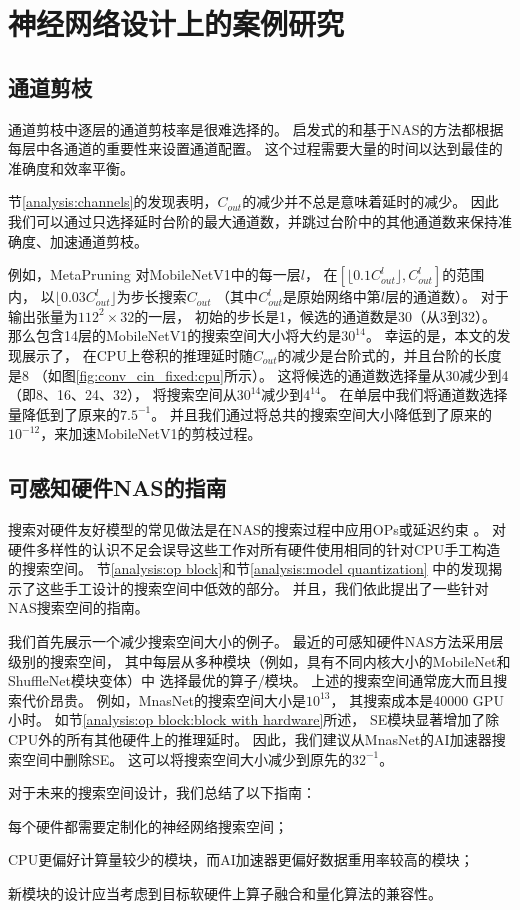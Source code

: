 \section{神经网络设计上的案例研究}
\label{case studies}

\subsection{通道剪枝}
通道剪枝中逐层的通道剪枝率是很难选择的。
启发式的和基于NAS的方法都根据每层中各通道的重要性来设置通道配置。
这个过程需要大量的时间以达到最佳的准确度和效率平衡。

节\ref{analysis:channels}的发现表明，$C_{out}$的减少并不总是意味着延时的减少。
因此我们可以通过只选择延时台阶的最大通道数，并跳过台阶中的其他通道数来保持准确度、加速通道剪枝。

例如，MetaPruning\cite{liu2019metapruning}
对MobileNetV1中的每一层$l$，
在$[\lfloor 0.1C_{out}^l \rfloor, C_{out}^l]$的范围内，
以$\lfloor 0.03C_{out}^l \rfloor$为步长搜索$C_{out}$
（其中$C_{out}^l$是原始网络中第$l$层的通道数）。
对于输出张量为$112^2\times 32$的一层，
初始的步长是1，候选的通道数是30（从3到32）。
那么包含14层的MobileNetV1的搜索空间大小将大约是$30^{14}$。
幸运的是，本文的发现展示了，
在CPU上卷积的推理延时随$C_{out}$的减少是台阶式的，并且台阶的长度是8
（如图\ref{fig:conv_cin_fixed:cpu}所示）。
这将候选的通道数选择量从30减少到4（即8、16、24、32），
将搜索空间从$30^{14}$减少到$4^{14}$。
在单层中我们将通道数选择量降低到了原来的$7.5^{-1}$。
并且我们通过将总共的搜索空间大小降低到了原来的$10^{-12}$，来加速MobileNetV1的剪枝过程。

\subsection{可感知硬件NAS的指南}
搜索对硬件友好模型的常见做法是在NAS的搜索过程中应用OPs或延迟约束
\cite{cai2018proxylessnas, wu2019fbnet}。
对硬件多样性的认识不足会误导这些工作对所有硬件使用相同的针对CPU手工构造的搜索空间。
节\ref{analysis:op block}和节\ref{analysis:model quantization}
中的发现揭示了这些手工设计的搜索空间中低效的部分。
并且，我们依此提出了一些针对NAS搜索空间的指南。

我们首先展示一个减少搜索空间大小的例子。
最近的可感知硬件NAS方法采用层级别的搜索空间，
其中每层从多种模块（例如，具有不同内核大小的MobileNet和ShuffleNet模块变体）中
选择最优的算子/模块。
上述的搜索空间通常庞大而且搜索代价昂贵。
例如，MnasNet的搜索空间大小是$10^{13}$，
其搜索成本是40000 GPU小时\cite{tan2019mnasnet}。
如节\ref{analysis:op block:block with hardware}所述，
SE模块显著增加了除CPU外的所有其他硬件上的推理延时。
因此，我们建议从MnasNet的AI加速器搜索空间中删除SE。
这可以将搜索空间大小减少到原先的$32^{-1}$。

对于未来的搜索空间设计，我们总结了以下指南：
\begin{enumerate*}
    \item 每个硬件都需要定制化的神经网络搜索空间；
    \item CPU更偏好计算量较少的模块，而AI加速器更偏好数据重用率较高的模块；
    \item 新模块的设计应当考虑到目标软硬件上算子融合和量化算法的兼容性。
\end{enumerate*}
